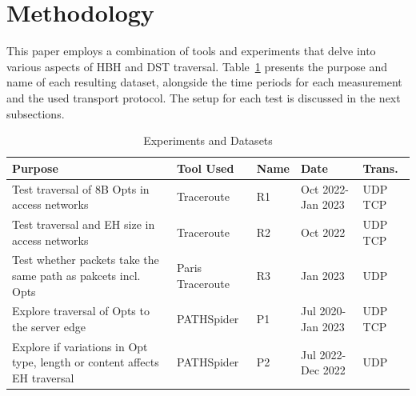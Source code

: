 \documentclass[conference]{IEEEtran}
\begin{document}








\section{Methodology} 
\label{sec:methodology}

This paper employs a combination of tools and experiments that
delve into various aspects of HBH and DST traversal. Table~\ref{tbl:datasets} presents the purpose and name of each resulting dataset, alongside the time periods for each measurement and the used transport protocol. The setup for each test is discussed in the next subsections.


\begin{table}
\begin{tabular}{p{}|p{}|p{}|p{}|p{}}
Purpose                                                                          & Tool Used        & Name & Date               & Trans. \\
\hline
Test traversal of 8B Opts in access networks                                  & Traceroute       & R1           & Oct 2022- Jan 2023 & UDP TCP          \\
\hline
Test traversal and EH size in access networks                                & Traceroute       & R2           & Oct 2022           & UDP TCP          \\
\hline
Test whether packets take the same path as pakcets incl. Opts & Paris Traceroute & R3           & Jan 2023           & UDP               \\
\hline
Explore traversal of Opts to the server edge                              & PATHSpider       & P1           & Jul 2020- Jan 2023 & UDP TCP          \\
\hline
Explore if variations in Opt type, length or content affects EH traversal   & PATHSpider       & P2           & Jul 2022- Dec 2022     & UDP              
\end{tabular}
  \caption{Experiments and Datasets}
  \label{tbl:datasets}
\end{table}
\end{document}
